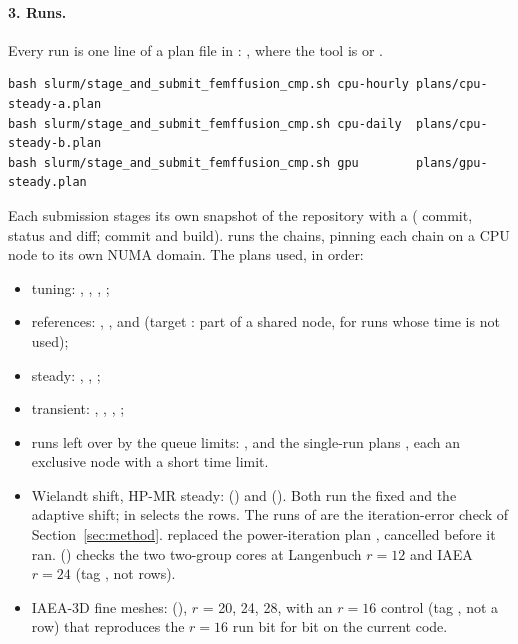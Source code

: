 \paragraph{3. Runs.} Every run is one line of a plan file in
:
, where the tool is
 or .
\begin{verbatim}
bash slurm/stage_and_submit_femffusion_cmp.sh cpu-hourly plans/cpu-steady-a.plan
bash slurm/stage_and_submit_femffusion_cmp.sh cpu-daily  plans/cpu-steady-b.plan
bash slurm/stage_and_submit_femffusion_cmp.sh gpu        plans/gpu-steady.plan
\end{verbatim}
Each submission stages its own snapshot of the repository with a
 (\garnet{} commit, status and diff; \ffn{} commit and
build).  runs the chains, pinning each chain on
a CPU node to its own NUMA domain. The plans used, in order:
\begin{itemize}
\item tuning: , , ,
  ;
\item references: , , and 
  (target : part of a shared node, for runs whose time
  is not used);
\item steady: , , ;
\item transient: , ,
  , ;
\item runs left over by the queue limits: ,
   and the single-run plans , each an
  exclusive node with a short time limit.
\item Wielandt shift, HP-MR steady:  ()
  and  (). Both run the fixed and the
  adaptive shift;  in  selects
  the rows. The  runs of  are the
  iteration-error check of Section~\ref{sec:method}. 
  replaced the power-iteration plan , cancelled
  before it ran.  () checks the two
  two-group cores at Langenbuch $r=12$ and IAEA $r=24$ (tag ,
  not rows).
\item IAEA-3D fine meshes:  (),
  $r$ = 20, 24, 28, with an $r=16$ control (tag , not a row)
  that reproduces the  $r=16$ run bit for bit on the
  current code.
\end{itemize}

